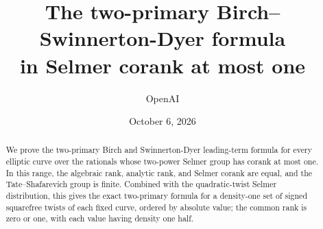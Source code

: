 \documentclass[11pt]{article}
\title{The two-primary Birch--Swinnerton-Dyer formula\\in Selmer corank at most one}
\author{OpenAI}
\date{October 6, 2026}
\numberwithin{equation}{section}
\theoremstyle{definition}
\theoremstyle{remark}
\begin{document}
\maketitle
\begin{abstract}
We prove the two-primary Birch and Swinnerton-Dyer leading-term formula for every elliptic curve over the rationals whose two-power Selmer group has corank at most one. In this range, the algebraic rank, analytic rank, and Selmer corank are equal, and the Tate--Shafarevich group is finite. Combined with the quadratic-twist Selmer distribution, this gives the exact two-primary formula for a density-one set of signed squarefree twists of each fixed curve, ordered by absolute value; the common rank is zero or one, with each value having density one half.
\end{abstract}
\tableofcontents
















\end{document}
